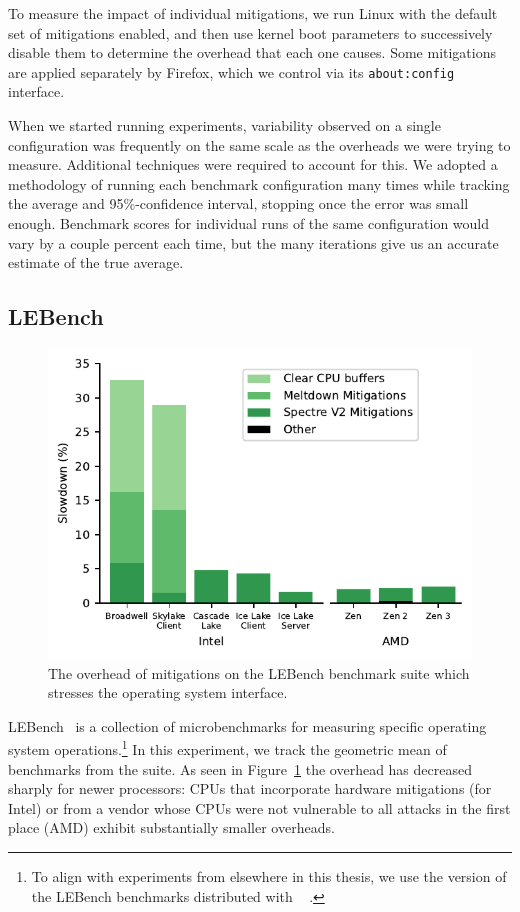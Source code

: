 To measure the impact of individual mitigations, we run  Linux with the default set of mitigations enabled, and then use kernel boot parameters to successively disable them to determine the overhead that each one causes.
Some mitigations are applied separately by Firefox, which we control via its \texttt{about:config} interface.

When we started running experiments, variability observed on a single configuration was frequently on the same scale as the overheads we were trying to measure.
Additional techniques were required to account for this.
We adopted a methodology of running each benchmark configuration many times while tracking the average and 95\%-confidence interval, stopping once the error was small enough.
Benchmark scores for individual runs of the same configuration would vary by a couple percent each time, but the many iterations give us an accurate estimate of the true average.

\subsection{LEBench}
\label{sec:benchmarks:lebench}

\begin{figure}[t]
    \includegraphics[width=\columnwidth]{plots/lebench.pdf}
    \caption{The overhead of mitigations on the LEBench benchmark suite which stresses the operating system interface.}
    \label{fig:lebench}
\end{figure}


LEBench~\cite{ren:lebench} is a collection of microbenchmarks for measuring specific operating system operations.\footnote{To align with experiments from elsewhere in this thesis, we use the version of the LEBench benchmarks distributed with \sys~\cite{behrens:ward} .}
In this experiment, we track the geometric mean of benchmarks from the suite.
As seen in Figure~\ref{fig:lebench} the overhead has decreased sharply for newer processors:
CPUs that incorporate hardware mitigations (for Intel) or from a vendor whose CPUs were not vulnerable to all attacks in the first place (AMD) exhibit substantially smaller overheads.

